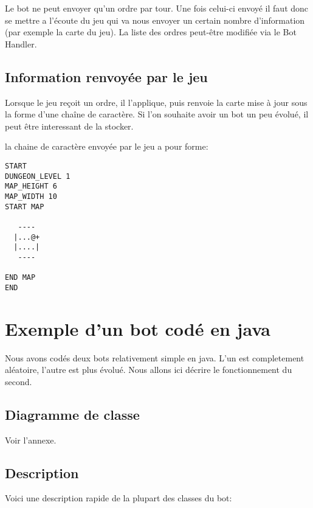 Le bot ne peut envoyer qu'un ordre par tour. Une fois celui-ci envoyé il faut donc se mettre a l'écoute du jeu qui va nous envoyer un certain nombre d'information (par exemple la carte du jeu). La liste des ordres peut-être modifiée via le Bot Handler.

\subsection{Information renvoyée par le jeu}
Lorsque le jeu reçoit un ordre, il l'applique, puis renvoie la carte mise à jour sous la forme d'une chaîne de caractère. Si l'on souhaite avoir un bot un peu évolué, il peut être interessant de la stocker. 

la chaine de caractère envoyée par le jeu a pour forme:

\begin{verbatim}
START
DUNGEON_LEVEL 1
MAP_HEIGHT 6
MAP_WIDTH 10
START MAP
          
   ----   
  |...@+  
  |....|  
   ----   
          
END MAP
END
\end{verbatim}



\section{Exemple d'un bot codé en java}

Nous avons codés deux bots relativement simple en java. L'un est completement aléatoire, l'autre est plus évolué. Nous allons ici décrire le fonctionnement du second.

\subsection{Diagramme de classe}

Voir l'annexe.
 
\subsection{Description}

Voici une description rapide de la plupart des classes du bot:


